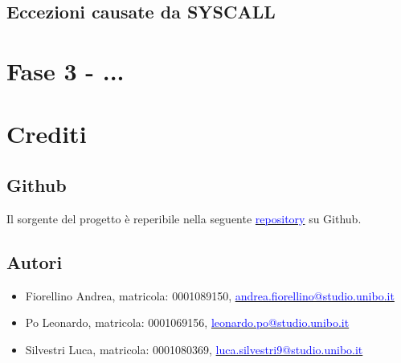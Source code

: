 \documentclass{article}
\begin{document}
\subsection{Eccezioni causate da SYSCALL}



\newpage

\section{Fase 3 - ...}

\newpage

\section{Crediti}
\subsection{Github}
Il sorgente del progetto è reperibile nella seguente \href{https://github.com/aNdReA9111/PandOS.git}{\textcolor{blue}{repository}} su Github.

\subsection{Autori}
\begin{itemize}
    \item Fiorellino Andrea, matricola: 0001089150, \href{mailto:andrea.fiorellino@studio.unibo.it}{\textcolor{blue}{andrea.fiorellino@studio.unibo.it}}
    \item Po Leonardo, matricola: 0001069156, \href{mailto:leonardo.po@studio.unibo.it}{\textcolor{blue}{leonardo.po@studio.unibo.it}}
    \item Silvestri Luca, matricola: 0001080369, \href{mailto:luca.silvestri9@studio.unibo.it}{\textcolor{blue}{luca.silvestri9@studio.unibo.it}}
\end{itemize}
\end{document}
